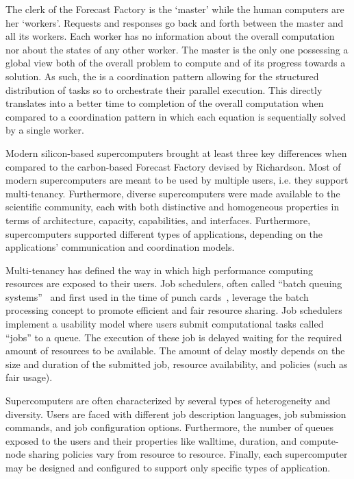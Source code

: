 \documentclass{sig-alternate}
\begin{document}
The clerk of the Forecast Factory is the `master' while the human computers are
her `workers'. Requests and responses go back and forth between the master and
all its workers. Each worker has no information about the overall computation
nor about the states of any other worker. The master is the only one possessing
a global view both of the overall problem to compute and of its progress towards
a solution. As such, the \MW is a coordination pattern allowing for the
structured distribution of tasks so to orchestrate their parallel execution.
This directly translates into a better time to completion of the overall
computation when compared to a coordination pattern in which each equation is
sequentially solved by a single worker.

Modern silicon-based supercomputers brought at least three key differences when
compared to the carbon-based Forecast Factory devised by Richardson. Most of
modern supercomputers are meant to be used by multiple users, i.e. they support
multi-tenancy. Furthermore, diverse supercomputers were made available to the
scientific community, each with both distinctive and homogeneous properties in
terms of architecture, capacity, capabilities, and interfaces. Furthermore,
supercomputers supported different types of applications, depending on the
applications' communication and coordination models.

Multi-tenancy has defined the way in which high performance computing resources
are exposed to their users. Job schedulers, often called ``batch queuing
systems''~\cite{czajkowski1998} and first used in the time of punch
cards~\cite{katz1966,silberschatz1998}, leverage the batch processing concept to
promote efficient and fair resource sharing. Job schedulers implement a
usability model where users submit computational tasks called ``jobs'' to a
queue. The execution of these job is delayed waiting for the required amount of
resources to be available. The amount of delay mostly depends on the size and
duration of the submitted job, resource availability, and policies (such as fair
usage).

Supercomputers are often characterized by several types of heterogeneity and
diversity. Users are faced with different job description languages, job
submission commands, and job configuration options. Furthermore,  the number of
queues exposed to the users and their properties like walltime, duration, and
compute-node sharing policies vary from resource to resource. Finally, each
supercomputer may be designed and configured to support only specific types of
application.
\end{document}
